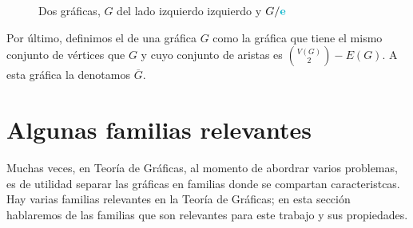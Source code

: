 \begin{figure}[htb!]
    \centering
    \caption{Dos gr\'aficas, $G$ del lado izquierdo izquierdo y $G/{\color{azulCielo}\textbf{e}}$}
\label{fig:ex-contract}
\end{figure}

\newpage

Por \'ultimo, definimos el  de una gr\'afica
$G$ como la gr\'afica que tiene el mismo conjunto de v\'ertices que $G$ y cuyo
conjunto de aristas es $\binom{V(G)}{2} - E(G)$. A esta gr\'afica la denotamos
$\overline{G}$.

\section{Algunas familias relevantes}
\label{sec:famGraf}
   
 Muchas veces, en Teor\'ia de Gr\'aficas, al momento de abordrar varios
problemas, es de utilidad separar las gr\'aficas en familias donde se compartan
caracteristcas. Hay varias familias relevantes en la Teor\'ia de Gr\'aficas; en
esta secci\'on hablaremos de las familias que son relevantes para este trabajo y
sus propiedades.

